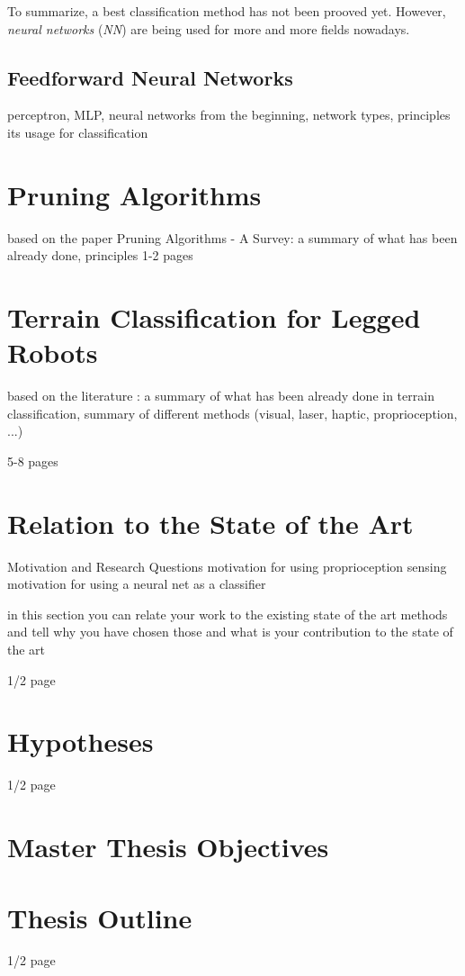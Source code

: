 To summarize, a best classification method has not been prooved yet. However, \textit{neural networks} (\textit{NN}) are being used for more and more fields nowadays.  

\subsection*{Feedforward Neural Networks} \label{ssec:intro_to_nn}

perceptron, MLP, neural networks from the beginning, network types, principles its usage for classification


\section{Pruning Algorithms} \label{sec:soa_pruning_algorithms}

based on the paper Pruning Algorithms - A Survey: a summary of what has been already done, principles 
1-2 pages

\section{Terrain Classification for Legged Robots} \label{sec:soa_terrain_classification}

based on the literature : a summary of what has been already done in terrain classification, summary of different methods (visual, laser, haptic, proprioception, ...)

5-8 pages 


\section{Relation to the State of the Art}
Motivation and Research Questions
motivation for using proprioception sensing
motivation for using a neural net as a classifier

in this section you can relate your work to the existing state of the art methods and tell why you have chosen those and what is your contribution to the state of the art

1/2 page

\section{Hypotheses}

1/2 page

\newpage
\section{Master Thesis Objectives} \label{sec:goals}

\section{Thesis Outline}

1/2 page


